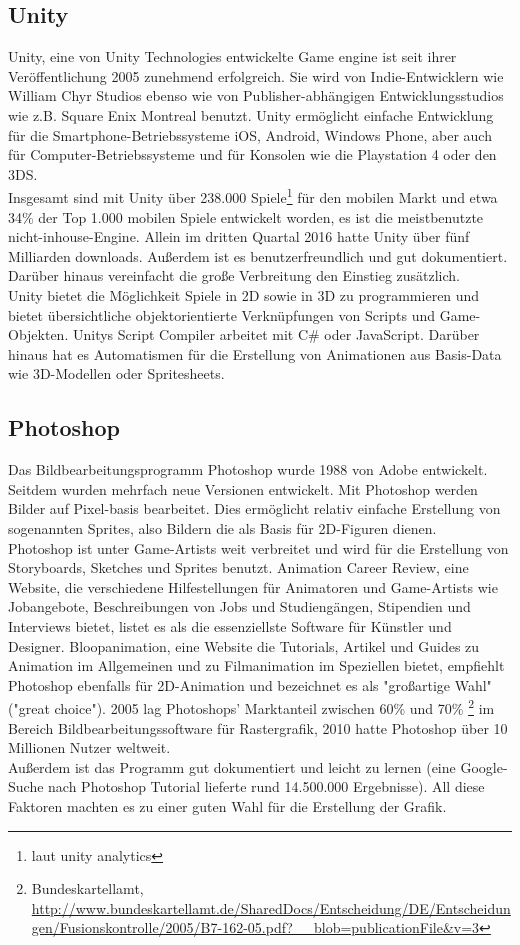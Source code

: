 \documentclass[extern,palatino]{cgBA}
\begin{document}
	\subsection{Unity}
	Unity, eine von Unity Technologies entwickelte Game engine ist seit ihrer Veröffentlichung 2005 zunehmend erfolgreich. %
	Sie wird von Indie-Entwicklern wie William Chyr Studios ebenso wie von Publisher-abhängigen Entwicklungsstudios wie z.B. Square Enix Montreal benutzt. Unity ermöglicht einfache Entwicklung für die Smartphone-Betriebssysteme iOS, Android, Windows Phone, aber auch für Computer-Betriebssysteme und für Konsolen wie die Playstation 4 oder den 3DS.
	\\Insgesamt sind mit Unity über 238.000 Spiele\footnote{laut unity analytics} für den mobilen Markt 
	und etwa 34\% der Top 1.000 mobilen Spiele entwickelt worden, es ist die meistbenutzte nicht-inhouse-Engine. Allein im dritten Quartal 2016 hatte Unity über fünf Milliarden downloads. Außerdem ist es benutzerfreundlich und gut dokumentiert. Darüber hinaus vereinfacht die große Verbreitung den Einstieg zusätzlich.
	\\Unity bietet die Möglichkeit Spiele in 2D sowie in 3D zu programmieren und bietet übersichtliche objektorientierte Verknüpfungen von Scripts und Game-Objekten. Unitys Script Compiler arbeitet mit C\# oder JavaScript. Darüber hinaus hat es Automatismen für die Erstellung von Animationen aus Basis-Data wie 3D-Modellen oder Spritesheets. 
	\newpage 
	\subsection{Photoshop}
	Das Bildbearbeitungsprogramm Photoshop wurde 1988 von Adobe entwickelt. Seitdem wurden mehrfach neue Versionen entwickelt. Mit Photoshop werden Bilder auf Pixel-basis bearbeitet. Dies ermöglicht relativ einfache Erstellung von sogenannten Sprites, also Bildern die als Basis für 2D-Figuren dienen.
	\\
	Photoshop ist unter Game-Artists weit verbreitet und wird für die Erstellung von Storyboards, Sketches und Sprites benutzt. Animation Career Review, eine Website, die verschiedene Hilfestellungen für Animatoren und Game-Artists wie Jobangebote, Beschreibungen von Jobs und Studiengängen, Stipendien und Interviews bietet, listet es als die essenziellste Software für Künstler und Designer. Bloopanimation, eine Website die Tutorials, Artikel und Guides zu Animation im Allgemeinen und zu Filmanimation im Speziellen bietet, empfiehlt Photoshop ebenfalls für 2D-Animation und bezeichnet es als "großartige Wahl" ("great choice"). 2005 lag Photoshops' Marktanteil zwischen 60\% und 70\% \footnote{Bundeskartellamt, \url{http://www.bundeskartellamt.de/SharedDocs/Entscheidung/DE/Entscheidungen/Fusionskontrolle/2005/B7-162-05.pdf?\_\_blob=publicationFile\&v=3}
	} im Bereich Bildbearbeitungssoftware für Rastergrafik, 2010 hatte Photoshop über 10 Millionen Nutzer weltweit.
	\\
	Außerdem ist das Programm gut dokumentiert und leicht zu lernen (eine Google-Suche nach Photoshop Tutorial lieferte rund 14.500.000 Ergebnisse). All diese Faktoren machten es zu einer guten Wahl für die Erstellung der Grafik.
	\newpage
	
\end{document}
